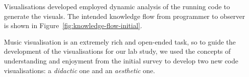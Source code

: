 
Visualisations developed employed dynamic analysis of the running code to generate the visuals. The intended knowledge flow from programmer to observer is shown in Figure~\ref{fig:knowledge-flow-initial}.

Music visualisation is an extremely rich
and open-ended task, so to guide the development of the visualisations
for our lab study, we used the concepts of understanding and enjoyment
from the initial survey to develop two new code visualisations: a
\emph{didactic} one and an \emph{aesthetic} one.

